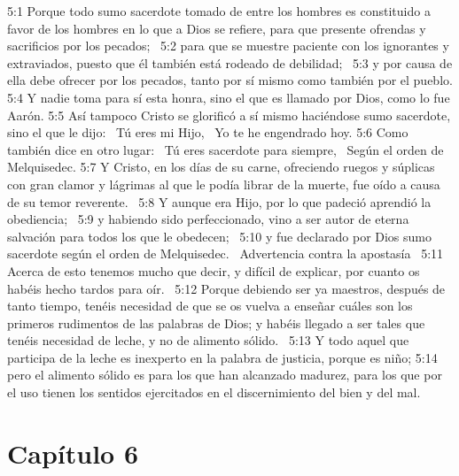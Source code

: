 5:1 Porque todo sumo sacerdote tomado de entre los hombres es constituido a favor de los hombres en lo que a Dios se refiere, para que presente ofrendas y sacrificios por los pecados;  
5:2 para que se muestre paciente con los ignorantes y extraviados, puesto que él también está rodeado de debilidad;  
5:3 y por causa de ella debe ofrecer por los pecados, tanto por sí mismo como también por el pueblo. 
5:4 Y nadie toma para sí esta honra, sino el que es llamado por Dios, como lo fue Aarón. 
5:5 Así tampoco Cristo se glorificó a sí mismo haciéndose sumo sacerdote, sino el que le dijo:  
Tú eres mi Hijo,  
Yo te he engendrado hoy. 
5:6 Como también dice en otro lugar:  
Tú eres sacerdote para siempre,  
Según el orden de Melquisedec. 
5:7 Y Cristo, en los días de su carne, ofreciendo ruegos y súplicas con gran clamor y lágrimas al que le podía librar de la muerte, fue oído a causa de su temor reverente.  
5:8 Y aunque era Hijo, por lo que padeció aprendió la obediencia;  
5:9 y habiendo sido perfeccionado, vino a ser autor de eterna salvación para todos los que le obedecen;  
5:10 y fue declarado por Dios sumo sacerdote según el orden de Melquisedec.  
Advertencia contra la apostasía  
5:11 Acerca de esto tenemos mucho que decir, y difícil de explicar, por cuanto os habéis hecho tardos para oír.  
5:12 Porque debiendo ser ya maestros, después de tanto tiempo, tenéis necesidad de que se os vuelva a enseñar cuáles son los primeros rudimentos de las palabras de Dios; y habéis llegado a ser tales que tenéis necesidad de leche, y no de alimento sólido.  
5:13 Y todo aquel que participa de la leche es inexperto en la palabra de justicia, porque es niño; 
5:14 pero el alimento sólido es para los que han alcanzado madurez, para los que por el uso tienen los sentidos ejercitados en el discernimiento del bien y del mal.  
\section*{Capítulo 6 }

